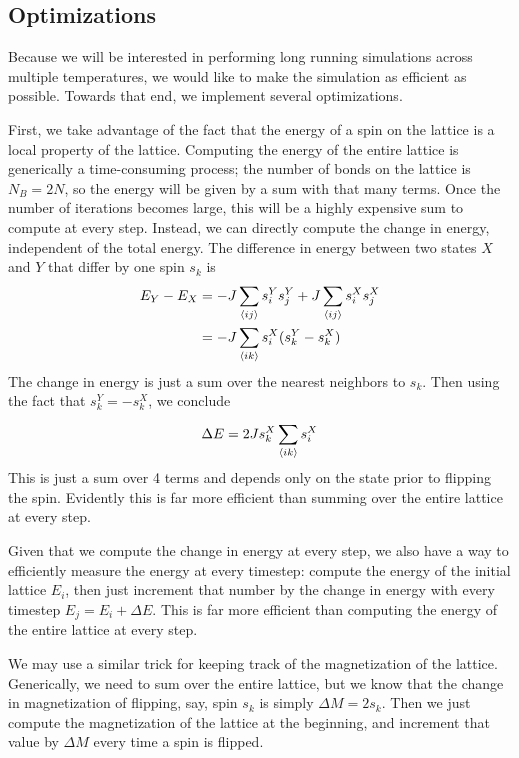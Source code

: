 \documentclass[twocolumn,aps]{revtex4-1} %
\begin{document}
\subsection{Optimizations}
Because we will be interested in performing long running simulations across multiple temperatures, we would like to make the simulation as efficient as possible. Towards that end, we implement several optimizations.

First, we take advantage of the fact that the energy of a spin on the lattice is a local property of the lattice. Computing the energy of the entire lattice is generically a time-consuming process; the number of bonds on the lattice is $N_B = 2N$, so the energy will be given by a sum with that many terms. Once the number of iterations becomes large, this will be a highly expensive sum to compute at every step. Instead, we can directly compute the change in energy, independent of the total energy. The difference in energy between two states $X$ and $Y$ that differ by one spin $s_k$ is
\begin{align}
E_Y - E_X &= -J\sum_{\braket{ij}}s^Y_is^Y_j + J\sum_{\braket{ij}}s^X_is^X_j \\
&= -J\sum_{\braket{ik}}s^X_i(s^Y_k-s^X_k)
\end{align}
The change in energy is just a sum over the nearest neighbors to $s_k$. Then using the fact that $s^Y_k = -s_k^X$, we conclude
\begin{equation}
\Delta E = 2Js_k^X\sum_{\braket{ik}}^{}s_i^X
\end{equation}
This is just a sum over 4 terms and depends only on the state prior to flipping the spin. Evidently this is far more efficient than summing over the entire lattice at every step.

Given that we compute the change in energy at every step, we also have a way to efficiently measure the energy at every timestep: compute the energy of the initial lattice $E_i$, then just increment that number by the change in energy with every timestep $E_j = E_i + \Delta E$. This is far more efficient than computing the energy of the entire lattice at every step.

We may use a similar trick for keeping track of the magnetization of the lattice. Generically, we need to sum over the entire lattice, but we know that the change in magnetization of flipping, say, spin $s_k$ is simply $\Delta M = 2s_k$. Then we just compute the magnetization of the lattice at the beginning, and increment that value by $\Delta M$ every time a spin is flipped.
\end{document}
